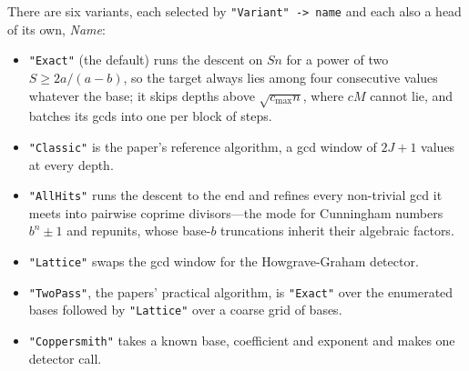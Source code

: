 There are six variants, each selected by \texttt{"Variant" -> name} and each also a head
of its own, \emph{Name}:

\begin{itemize}
\item \texttt{"Exact"} (the default) runs the descent on \(Sn\) for a power of two
\(S\ge2a/(a-b)\), so the target always lies among four consecutive values whatever the
base; it skips depths above \(\sqrt{c_{\max}n}\), where \(cM\) cannot lie, and batches
its gcds into one per block of steps.
\item \texttt{"Classic"} is the paper's reference algorithm, a gcd window of \(2J+1\)
values at every depth.
\item \texttt{"AllHits"} runs the descent to the end and refines every non-trivial gcd it
meets into pairwise coprime divisors---the mode for Cunningham numbers \(b^{n}\pm1\) and
repunits, whose base-\(b\) truncations inherit their algebraic factors.
\item \texttt{"Lattice"} swaps the gcd window for the Howgrave-Graham detector.
\item \texttt{"TwoPass"}, the papers' practical algorithm, is \texttt{"Exact"} over the
enumerated bases followed by \texttt{"Lattice"} over a coarse grid of bases.
\item \texttt{"Coppersmith"} takes a known base, coefficient and exponent and makes one
detector call.
\end{itemize}


